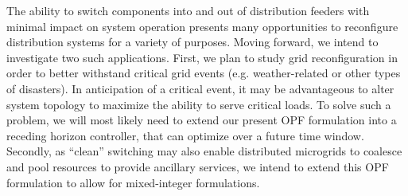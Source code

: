The ability to switch components into and out of distribution feeders with minimal impact on system operation presents many opportunities to reconfigure distribution systems for a variety of purposes.  Moving forward, we intend to investigate two such applications.  First, we plan to study grid reconfiguration in order to better withstand critical grid events (e.g. weather-related or other types of disasters).  In anticipation of a critical event, it may be advantageous to alter system topology to maximize the ability to serve critical loads.  To solve such a problem, we will most likely need to extend our present OPF formulation into a receding horizon controller, that can optimize over a future time window.  Secondly, as ``clean'' switching may also enable distributed microgrids to coalesce and pool resources to provide ancillary services, we intend to extend this OPF formulation to allow for mixed-integer formulations.  



